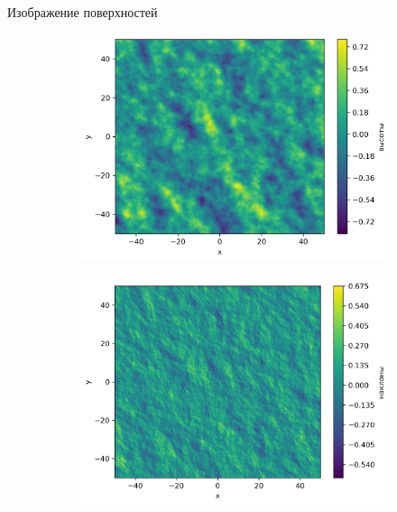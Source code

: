 \documentclass[10pt,pdf,hyperref={unicode}, dvipsnames]{beamer}
\begin{document}
\begin{frame}[t]{Изображение поверхностей}
    \begin{figure}[h]
        \begin{subfigure}{0.49\linewidth}
            \centering
            \includegraphics[width=1\linewidth]{img/heights}
        \end{subfigure}
        \begin{subfigure}{0.49\linewidth}
            \centering
            \includegraphics[width=1\linewidth]{img/slopes}
        \end{subfigure}
        \begin{subfigure}{0.49\linewidth}
            \centering

\end{subfigure}
\end{figure}
\end{frame}
\end{document}
